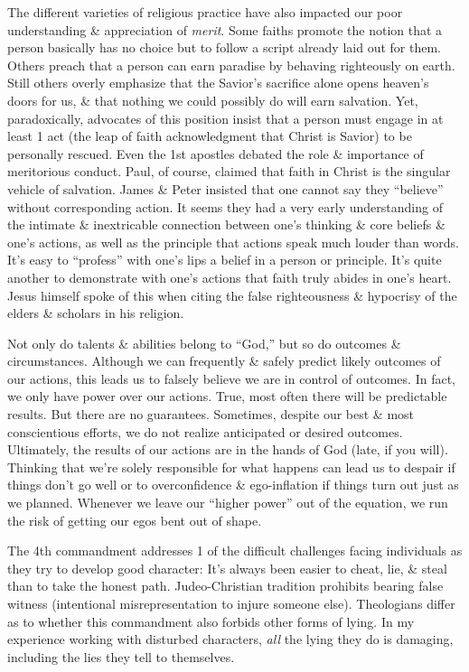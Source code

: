 \documentclass{article}
\numberwithin{equation}{section}
\begin{document}
The different varieties of religious practice have also impacted our poor understanding \& appreciation of \textit{merit}. Some faiths promote the notion that a person basically has no choice but to follow a script already laid out for them. Others preach that a person can earn paradise by behaving righteously on earth. Still others overly emphasize that the Savior's sacrifice alone opens heaven's doors for us, \& that nothing we could possibly do will earn salvation. Yet, paradoxically, advocates of this position insist that a person must engage in at least 1 act (the leap of faith acknowledgment that Christ is Savior) to be personally rescued. Even the 1st apostles debated the role \& importance of meritorious conduct. Paul, of course, claimed that faith in Christ is the singular vehicle of salvation. James \& Peter insisted that one cannot say they ``believe'' without corresponding action. It seems they had a very early understanding of the intimate \& inextricable connection between one's thinking \& core beliefs \& one's actions, as well as the principle that actions speak much louder than words. It's easy to ``profess'' with one's lips a belief in a person or principle. It's quite another to demonstrate with one's actions that faith truly abides in one's heart. Jesus himself spoke of this when citing the false righteousness \& hypocrisy of the elders \& scholars in his religion.

Not only do talents \& abilities belong to ``God,'' but so do outcomes \& circumstances. Although we can frequently \& safely predict likely outcomes of our actions, this leads us to falsely believe we are in control of outcomes. In fact, we only have power over our actions. True, most often there will be predictable results. But there are no guarantees. Sometimes, despite our best \& most conscientious efforts, we do not realize anticipated or desired outcomes. Ultimately, the results of our actions are in the hands of God (late, if you will). Thinking that we're solely responsible for what happens can lead us to despair if things don't go well or to overconfidence \& ego-inflation if things turn out just as we planned. Whenever we leave our ``higher power'' out of the equation, we run the risk of getting our egos bent out of shape.

The 4th commandment addresses 1 of the difficult challenges facing individuals as they try to develop good character: It's always been easier to cheat, lie, \& steal than to take the honest path. Judeo-Christian tradition prohibits bearing false witness (intentional misrepresentation to injure someone else). Theologians differ as to whether this commandment also forbids other forms of lying. In my experience working with disturbed characters, \textit{all} the lying they do is damaging, including the lies they tell to themselves.
\end{document}
